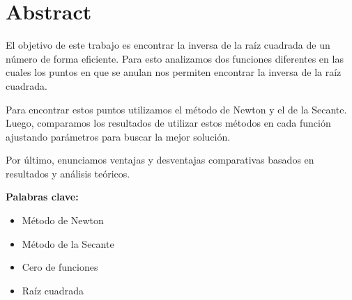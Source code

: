 \section{Abstract}

El objetivo de este trabajo es encontrar la inversa de la raíz cuadrada de un
número de forma eficiente. Para esto analizamos dos funciones diferentes en las
cuales los puntos en que se anulan nos permiten encontrar la inversa de la raíz
cuadrada.

Para encontrar estos puntos utilizamos el método de Newton y el de la Secante.
Luego, comparamos los resultados de utilizar estos métodos en cada función
ajustando parámetros para buscar la mejor solución.

Por último, enunciamos ventajas y desventajas comparativas basados en
resultados y análisis teóricos.

{\bf Palabras clave:}
\begin{itemize}
    \item Método de Newton
    \item Método de la Secante
    \item Cero de funciones
    \item Raíz cuadrada
\end{itemize}

